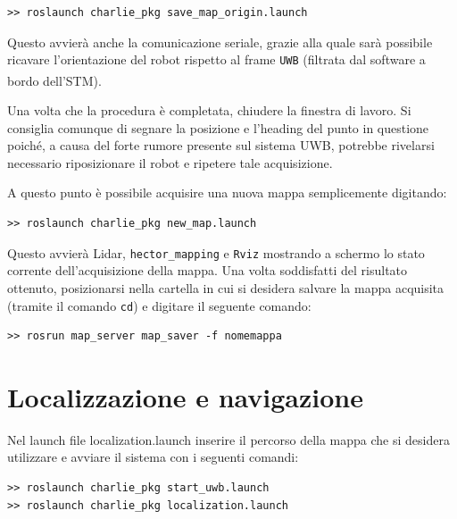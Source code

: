 \medskip
\begin{tcolorbox}
\begin{verbatim}
>> roslaunch charlie_pkg save_map_origin.launch
\end{verbatim}
\end{tcolorbox}

Questo avvierà anche la comunicazione seriale, grazie alla quale sarà possibile ricavare l'orientazione del robot rispetto al frame \verb!UWB! (filtrata dal software a bordo dell'STM\textsuperscript\textregistered).

Una volta che la procedura è completata, chiudere la finestra di lavoro. Si consiglia comunque di segnare la posizione e l'heading del punto in questione poiché, a causa del forte rumore presente sul sistema UWB, potrebbe rivelarsi necessario riposizionare il robot e ripetere tale acquisizione.

A questo punto è possibile acquisire una nuova mappa semplicemente digitando:
\medskip
\begin{tcolorbox}
\begin{verbatim}
>> roslaunch charlie_pkg new_map.launch
\end{verbatim}
\end{tcolorbox}

Questo avvierà Lidar, \verb!hector_mapping! e \verb!Rviz! mostrando a schermo lo stato corrente dell'acquisizione della mappa. 
Una volta soddisfatti del risultato ottenuto, posizionarsi nella cartella in cui si desidera salvare la mappa acquisita (tramite il comando \verb!cd!)  e digitare il seguente comando:

\medskip
\begin{tcolorbox}
\begin{verbatim}
>> rosrun map_server map_saver -f nomemappa
\end{verbatim}
\end{tcolorbox}
\section*{Localizzazione e navigazione}

Nel launch file localization.launch inserire il percorso della mappa che si desidera utilizzare e avviare il sistema con i seguenti comandi:

\medskip
\begin{tcolorbox}
\begin{verbatim}
>> roslaunch charlie_pkg start_uwb.launch
>> roslaunch charlie_pkg localization.launch
\end{verbatim}
\end{tcolorbox}

